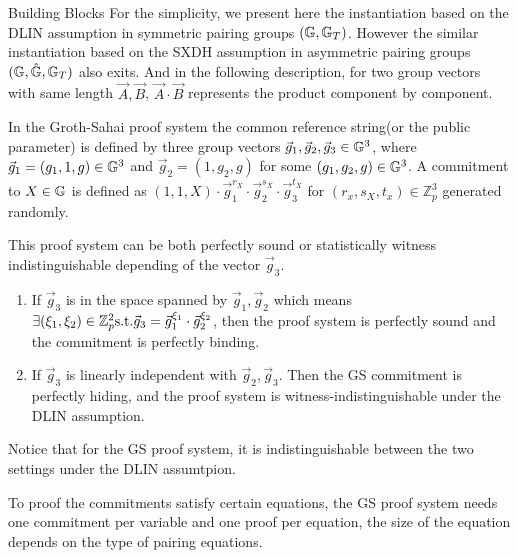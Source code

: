 \begin{subsection}{Building Blocks}
    For the simplicity, we present here the instantiation based on the DLIN assumption in symmetric pairing groups $(\mathbb{G}, \mathbb{G}_T)$. However the similar instantiation based on the SXDH assumption in asymmetric pairing groups $(\mathbb{G}, \hat{\mathbb{G}}, \mathbb{G}_T)$ also exits. And in the following description, for two group vectors with same length $\vec{A}, \vec{B}$, $\vec{A} \cdot \vec{B}$ represents the product component by component.
    
    In the Groth-Sahai proof system the common reference string(or the public parameter) is defined by three group vectors $\vec{g}_1, \vec{g}_2, \vec{g}_3 \in \mathbb{G}^3$, where $\vec{g}_1 = (g_1, 1, g) \in \mathbb{G}^3$ and $\vec{g}_2 = (1, g_2, g)$ for some $(g_1, g_2, g) \in \mathbb{G}^3$. A commitment to $X \in \mathbb{G}$ is defined as $(1, 1, X) \cdot \vec{g}_1^{r_X} \cdot \vec{g}_2^{s_X} \cdot \vec{g}_3^{t_X}$ for $(r_x, s_X, t_x) \in \mathbb{Z}_p^3$ generated randomly.

    This proof system can be both perfectly sound or statistically witness indistinguishable depending of the vector $\vec{g}_3$.
    \begin{enumerate}
    \item If $\vec{g}_3$ is in the space spanned by $\vec{g}_1, \vec{g}_2$ which means $\exists (\xi_1, \xi_2) \in \mathbb{Z}_p^2 \textrm{s.t.} \vec{g}_3 = \vec{g}_1^{\xi_1} \cdot \vec{g}_2^{\xi_2}$, then the proof system is perfectly sound and the commitment is perfectly binding.
    \item If $\vec{g}_3$ is linearly independent with $\vec{g}_2, \vec{g}_3$. Then the GS commitment is perfectly hiding, and the proof system is witness-indistinguishable under the DLIN assumption.
    \end{enumerate}

    Notice that for the GS proof system, it is indistinguishable between the two settings under the DLIN assumtpion. 

    To proof the commitments satisfy certain equations, the GS proof system needs one commitment per variable and one proof per equation, the size of the equation depends on the type of pairing equations.

\end{subsection}












